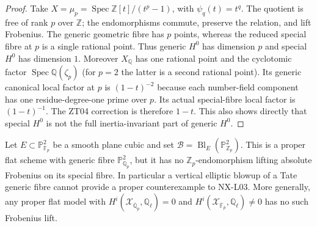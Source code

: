 \begin{proof}
Take $X=\mu_p=\operatorname{Spec}\mathbb Z[t]/(t^p-1)$, with
$\psi_q(t)=t^q$.  The quotient is free of rank $p$ over $\mathbb Z$;
the endomorphisms commute, preserve the relation, and lift Frobenius.
The generic geometric fibre has $p$ points, whereas the reduced
special fibre at $p$ is a single rational point.  Thus generic $H^0$
has dimension $p$ and special $H^0$ has dimension $1$.
Moreover $X_{\mathbb Q}$ has one rational point and the cyclotomic
factor $\operatorname{Spec}\mathbb Q(\zeta_p)$ (for $p=2$ the latter
is a second rational point).  Its generic canonical local factor at
$p$ is $(1-t)^{-2}$ because each number-field component has one
residue-degree-one prime over $p$.  Its actual special-fibre local
factor is $(1-t)^{-1}$.  The ZT04 correction is therefore $1-t$.
This also shows directly that special $H^0$ is not the full
inertia-invariant part of generic $H^0$.
\end{proof}

\begin{corollary}
\label{NX-L05}
Let $E\subset\mathbb P^2_{\mathbb F_p}$ be a smooth plane cubic and set
$\mathcal B=\operatorname{Bl}_{E}(\mathbb P^2_{\mathbb Z_p})$.
This is a proper flat scheme with generic fibre $\mathbb P^2_{\mathbb Q_p}$,
but it has no $\mathbb Z_p$-endomorphism lifting absolute Frobenius on
its special fibre.  In particular a vertical elliptic blowup of a
Tate generic fibre cannot provide a proper counterexample to NX-L03.
More generally, any proper flat model with
$H^i(\mathcal X_{\overline{\mathbb Q}_p},\mathbb Q_\ell)=0$ and
$H^i(\mathcal X_{\overline{\mathbb F}_p},\mathbb Q_\ell)\ne0$ has no
such Frobenius lift.
\end{corollary}

